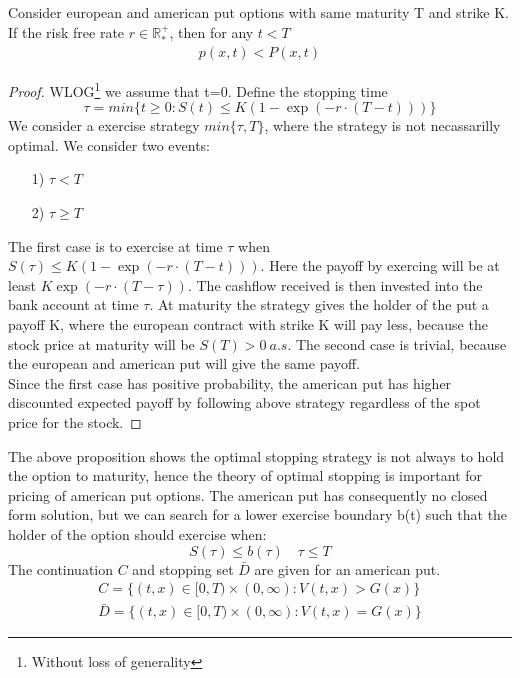 \begin{proposition}{}
Consider european and american put options with same maturity T and strike K. If the risk free rate $r\in \mathbb{R}_*^+$, then for any $t<T$
\begin{equation}
\begin{split}
p(x,t)<P(x,t)
\end{split}
\end{equation}
\begin{proof}
WLOG\footnote{Without loss of generality} we assume that t=0. Define the stopping time
$$\tau = min \{t\geq 0 : S(t) \leq K(1-\exp(-r\cdot (T-t)))\}$$
We consider a exercise strategy $min\{\tau, T\}$, where the strategy is not necassarilly optimal. We consider two events:
\begin{enumerate}
\item[1)] $\tau<T$
\item[2)] $\tau \geq T$
\end{enumerate}
The first case is to exercise at time $\tau$ when $S(\tau) \leq K(1-\exp(-r\cdot (T-t)))$. Here the payoff by exercing will be at least $K\exp(-r\cdot (T-\tau))$. The cashflow received is then invested into the bank account at time $\tau$. At maturity the strategy gives the holder of the put a payoff K, where the european contract with strike K will pay less, because the stock price at maturity will be $S(T)>0 \ a.s.$
The second case is trivial, because the european and american put will give the same payoff. \\
Since the first case has positive probability, the american put has higher discounted expected payoff by following above strategy regardless of the spot price for the stock. 
\end{proof}
\end{proposition}
The above proposition shows the optimal stopping strategy is not always to hold the option to maturity, hence the theory of optimal stopping is important for pricing of american put options. The american put has consequently no closed form solution, but we can search for a lower exercise boundary b(t) such that the holder of the option should exercise when:
$$S(\tau)\leq b(\tau) \quad \tau \leq T$$
The continuation $C$ and stopping set $\bar{D}$ are given for an american put.
\begin{align}
C=\{(t,x) \in [0,T) \times (0,\infty) : V(t,x) > G(x) \}\\
\bar{D}=\{(t,x) \in [0,T) \times (0,\infty) : V(t,x) = G(x) \}
\end{align} 


